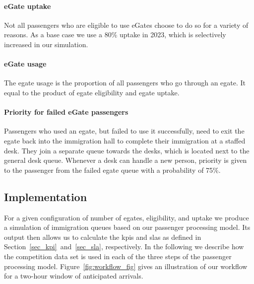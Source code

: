 \documentclass[10pt]{article}
\begin{document}
\paragraph{eGate uptake} 
Not all passengers who are eligible to use eGates choose to do so for a variety of reasons. As a base case we use a 80\% uptake in 2023, which is selectively increased in our simulation. 

\paragraph{eGate usage}
The \gls{egate} usage is the proportion of all passengers who go through an \gls{egate}. It equal to the product of \gls{egate} eligibility and \gls{egate} uptake.

\paragraph{Priority for failed eGate passengers}
Passengers who used an \gls{egate}, but failed to use it successfully, need to exit the \gls{egate} back into the immigration hall to complete their immigration at a staffed desk. They join a separate queue towards the desks, which is located next to the general desk queue. Whenever a desk can handle a new person, priority is given to the passenger from the failed \gls{egate} queue with a probability of 75\%.


\subsection{Implementation}

For a given configuration of number of \glspl{egate}, eligibility, and uptake we produce a simulation of immigration queues based on our passenger processing model. Its output then allows us to calculate the \glspl{kpi} and \glspl{sla} as defined in Section~\ref{sec_kpi}~and~\ref{sec_sla}, respectively.  In the following we describe how the competition data set is used in each of the three steps of the passenger processing model. Figure~\ref{fig:workflow_fig} gives an illustration of our workflow for a two-hour window of anticipated arrivals.
\end{document}
